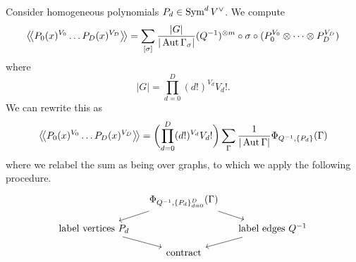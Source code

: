 \begin{example}
  Consider homogeneous polynomials $P_d \in \operatorname{Sym}^d V^\vee$. We compute
  \begin{equation*}
    \big \langle \! \big \langle {P_0(x)^{V_0} \dots P_D(x)^{V_D}} \big \rangle \! \big \rangle
    = \sum_{[\sigma]} \frac{|G|}{|\operatorname{Aut} \Gamma_\sigma|}
    (Q^{-1})^{\otimes m} \circ \sigma \circ (P_0^{V_0} \otimes \dots \otimes P_D^{V_D}) 
  \end{equation*}
  where
  \begin{equation*}
    |G| = \prod_{d = 0}^D (d!)^{V_d} V_d!.
  \end{equation*}
  We can rewrite this as
  \begin{equation*}
    \big \langle \! \big \langle {P_0(x)^{V_0} \dots P_D(x)^{V_D}} \big \rangle \! \big \rangle
    = \biggl( \prod_{d = 0}^D (d!)^{V_d} V_d! \biggr)
    \sum_{\Gamma} \frac{1}{|\operatorname{Aut} \Gamma|} \Phi_{Q^{-1}, \{P_d\}} (\Gamma)
  \end{equation*}
  where we relabel the sum as being over graphs, to which we apply the following procedure.
  \begin{equation*}
    \begin{tikzcd}[sep=small]
    & \Phi_{Q^{-1}, \{{P_d}\}_{d = 0}^D} (\Gamma) \arrow[dr] \arrow[dl] & \\
      \text{label vertices } P_d \arrow[dr] & & \text{label edges } Q^{-1} \arrow[dl] \\
    & \text{contract} &
  \end{tikzcd}
  \end{equation*}
\end{example}

